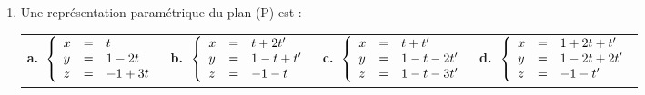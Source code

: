 \documentclass[10pt]{article}
\begin{document}
\begin{enumerate}
\item Une représentation paramétrique du plan (P) est : 

\medskip
\scriptsize{\begin{tabularx}{\linewidth}{*{4}{X}}
\textbf{a.~}$\left\{\begin{array}{l c l}
x&=& t\\y&=& 1- 2t\\ z&=& -1 + 3t \end{array}\right.$&
\textbf{b.~}$\left\{\begin{array}{l c l}
x&=& t + 2t'\\y&=& 1- t + t'\\z&=& - 1 - t\end{array}\right.$&
\textbf{c.~}$\left\{\begin{array}{l c l} 	 
x&=&t + t'\\ y&=& 1 - t- 2t'\\z&=& 1 - t - 3t'\end{array}\right.$& 
\textbf{d.~}$\left\{\begin{array}{l c l}
x&=& 1 + 2t + t'\\y&=& 1 - 2t + 2t'\\z&=& - 1 - t'\end{array}\right.$
\end{tabularx}} \normalsize

\medskip 	 	 


\end{enumerate}
\end{document}
